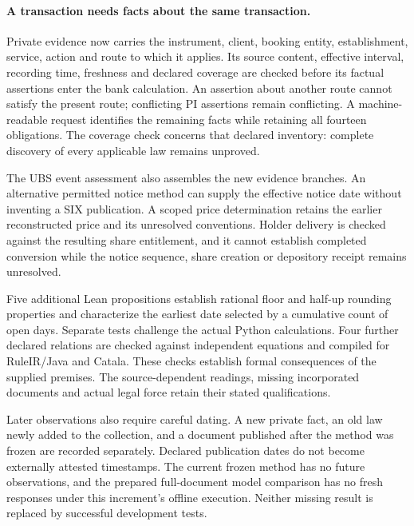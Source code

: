 \paragraph{A transaction needs facts about the same transaction.}
Private evidence now carries the instrument, client, booking entity,
establishment, service, action and route to which it applies. Its source
content, effective interval, recording time, freshness and declared coverage
are checked before its factual assertions enter the bank calculation.
An assertion about another route cannot satisfy the present route; conflicting
PI assertions remain conflicting. A machine-readable request identifies the
remaining facts while retaining all fourteen obligations. The coverage check
concerns that declared inventory: complete discovery of every applicable law
remains unproved.

The UBS event assessment also assembles the new evidence branches. An
alternative permitted notice method can supply the effective notice date
without inventing a SIX publication. A scoped price determination retains
the earlier reconstructed price and its unresolved conventions. Holder
delivery is checked against the resulting share entitlement, and it cannot
establish completed conversion while the notice sequence, share creation or
depository receipt remains unresolved.

Five additional Lean propositions establish rational floor and half-up
rounding properties and characterize the earliest date selected by a
cumulative count of open days. Separate tests challenge the actual Python
calculations. Four further declared relations are checked against independent
equations and compiled for RuleIR/Java and Catala. These checks establish
formal consequences of the supplied premises. The source-dependent readings,
missing incorporated documents and actual legal force retain their stated
qualifications.

Later observations also require careful dating. A new private fact, an old
law newly added to the collection, and a document published after the method
was frozen are recorded separately. Declared publication dates do not become
externally attested timestamps. The current frozen method has no future
observations, and the prepared full-document model comparison has no fresh
responses under this increment's offline execution. Neither missing result
is replaced by successful development tests.
